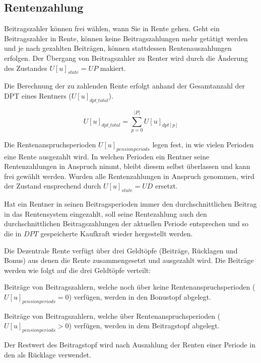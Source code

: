 \subsection{Rentenzahlung}

Beitragszahler können frei wählen, wann Sie in Rente gehen. Geht ein Beitragszahler in Rente, können keine Beitragszahlungen mehr getätigt werden und je nach gezahlten Beiträgen, können stattdessen Rentenauszahlungen erfolgen. Der Übergang von Beitragszahler zu Renter wird durch die Änderung des Zustandes $U[u]_{state} = UP$ makiert.

Die Berechnung der zu zahlenden Rente erfolgt anhand der Gesamtanzahl der DPT eines Rentners ($U[u]_{dpt\_total}$).

\begin{equation}
U[u]_{dpt\_total} = \sum_{p=0}^{|P|} U[u]_{dpt[p]}
\end{equation}

Die Rentenanspruchsperioden $U[u]_{pensionperiods}$ legen fest, in wie vielen Perioden eine Rente ausgezahlt wird. In
welchen Perioden ein Rentner seine Rentenzahlungen in Anspruch nimmt, bleibt diesem selbst überlassen und kann frei
gewählt werden. Wurden alle Rentenzahlungen in Anspruch genommen, wird der Zustand ensprechend durch $U[u]_{state} = UD$ ersetzt.

Hat ein
Rentner in seinen Beitragsperioden immer den durchschnittlichen Beitrag in das
Rentensystem eingezahlt, soll seine
Rentezahlung auch den durchschnittlichen Beitragszahlungen der aktuellen
Periode entsprechen und so die in $DPT$ gespeicherte Kaufkraft wieder hergestellt werden.


Die Dezentrale Rente verfügt über drei Geldtöpfe (Beiträge, Rücklagen und Bonus) 
aus denen die Rente zusammengesetzt und ausgezahlt wird. Die Beiträge werden wie folgt auf 
die drei Geldtöpfe verteilt:
\begin{compactenum}
\item Beiträge von Beitragszahlern, welche noch über keine Rentenanspruchsperioden ($U[u]_{pensionperiods} = 0$) verfügen, werden in den Bonustopf abgelegt.
\item Beiträge von Beitragszahlern, welche über Rentenanspruchsperioden ($U[u]_{pensionperiods} > 0$) verfügen, werden in dem Beitragstopf abgelegt.
\item Der Restwert des Beitragstopf wird nach Auszahlung der Renten einer Periode in den als Rücklage verwendet.
\end{compactenum}

